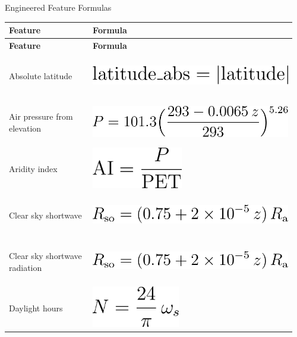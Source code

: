 \documentclass[11pt]{article}
\begin{document}
\begin{center}\Large Engineered Feature Formulas\end{center}
\vspace{0.5em}
\setlength{\extrarowheight}{2pt}
\begin{longtable}{@{}p{0.28\linewidth} p{0.68\linewidth}@{}}
\toprule
\textbf{Feature} & \textbf{Formula} \\
\midrule
\endfirsthead
\toprule
\textbf{Feature} & \textbf{Formula} \\
\midrule
\endhead
\bottomrule
\endfoot
Absolute latitude & \includegraphics[height=18mm]{figures/formulas/absolute_latitude.png} \\
Air pressure from elevation & \includegraphics[height=18mm]{figures/formulas/air_pressure_from_elevation.png} \\
Aridity index & \includegraphics[height=18mm]{figures/formulas/aridity_index.png} \\
Clear sky shortwave & \includegraphics[height=18mm]{figures/formulas/clear_sky_shortwave.png} \\
Clear sky shortwave radiation & \includegraphics[height=18mm]{figures/formulas/clear_sky_shortwave_radiation.png} \\
Daylight hours & \includegraphics[height=18mm]{figures/formulas/daylight_hours.png} \\

\end{longtable}
\end{document}
